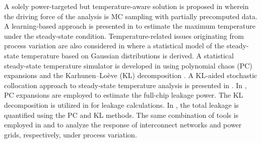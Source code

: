 A solely power-targeted but temperature-aware solution is proposed in
\cite{chandra2010} wherein the driving force of the analysis is MC sampling with
partially precomputed data. A learning-based approach is presented in
\cite{juan2011} to estimate the maximum temperature under the steady-state
condition. Temperature-related issues originating from process variation are
also considered in \cite{juan2012} where a statistical model of the steady-state
temperature based on Gaussian distributions is derived. A statistical
steady-state temperature simulator is developed in \cite{huang2009a} using
polynomial chaos (PC) expansions and the Karhunen--Lo\`{e}ve (KL) decomposition
\cite{xiu2010, ghanem1991}. A KL-aided stochastic collocation \cite{xiu2010}
approach to steady-state temperature analysis is presented in \cite{lee2013}. In
\cite{shen2009}, PC expansions are employed to estimate the full-chip leakage
power. The KL decomposition is utilized in \cite{bhardwaj2006} for leakage
calculations. In \cite{bhardwaj2008}, the total leakage is quantified using the
PC and KL methods. The same combination of tools is employed in
\cite{vrudhula2006} and \cite{ghanta2006} to analyze the response of
interconnect networks and power grids, respectively, under process variation.

